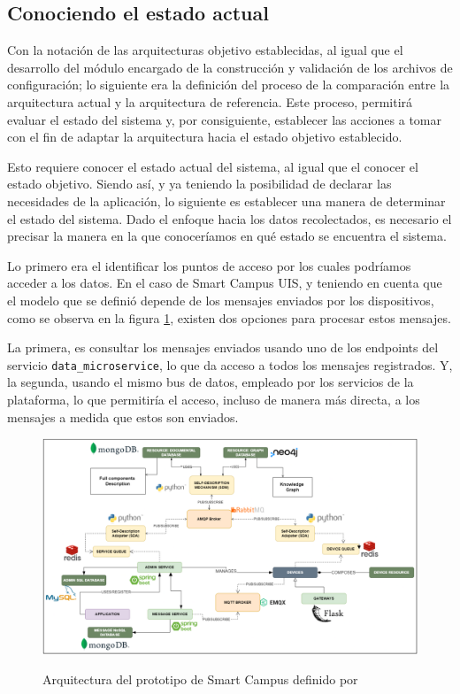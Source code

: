\subsection{Conociendo el estado actual}

Con la notación de las arquitecturas objetivo establecidas, al igual que el desarrollo del módulo encargado de la construcción y validación de los archivos de configuración; lo siguiente era la definición del proceso de la comparación entre la arquitectura actual y la arquitectura de referencia. Este proceso, permitirá evaluar el estado del sistema y, por consiguiente, establecer las acciones a tomar con el fin de adaptar la arquitectura hacia el estado objetivo establecido.

Esto requiere conocer el estado actual del sistema, al igual que el conocer el estado objetivo. Siendo así, y ya teniendo la posibilidad de declarar las necesidades de la aplicación, lo siguiente es establecer una manera de determinar el estado del sistema. Dado el enfoque hacia los datos recolectados, es necesario el precisar la manera en la que conoceríamos en qué estado se encuentra el sistema.

Lo primero era el identificar los puntos de acceso por los cuales podríamos acceder a los datos. En el caso de Smart Campus UIS, y teniendo en cuenta que el modelo que se definió depende de los mensajes enviados por los dispositivos, como se observa en la figura \ref{fig:ArquitecturaSmartCampus}, existen dos opciones para procesar estos mensajes. 

La primera, es consultar los mensajes enviados usando uno de los endpoints del servicio \texttt{data\_microservice}, lo que da acceso a todos los mensajes registrados. Y, la segunda, usando el mismo bus de datos, empleado por los servicios de la plataforma, lo que permitiría el acceso, incluso de manera más directa, a los mensajes a medida que estos son enviados.

\begin{figure}[ht]
    \centering
    \caption{Arquitectura del prototipo de Smart Campus definido por }
    \includegraphics[width=\linewidth]{images/ArquitecturaSmartCampus.png}
    \label{fig:ArquitecturaSmartCampus}
\end{figure}

